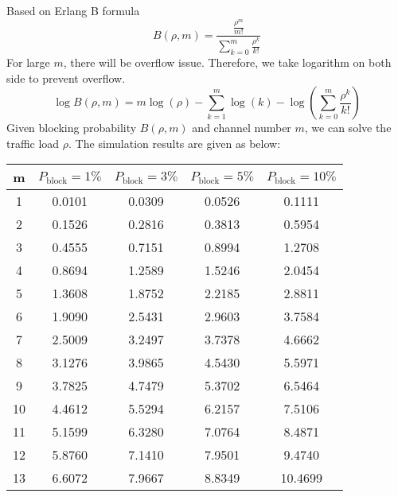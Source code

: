Based on Erlang B formula
\begin{equation*}
    B\left(\rho, m\right) = \frac{\frac{\rho^{m}}{m!}}{\sum\limits_{k = 0}^{m}\frac{\rho^{k}}{k!}}
\end{equation*}
For large $m$, there will be overflow issue. Therefore, we take logarithm on both side to prevent overflow.
\begin{equation*}
    \log B\left(\rho, m\right) = m \log\left(\rho\right) - \sum_{k=1}^{m} \log\left(k\right) - \log\left(\sum\limits_{k = 0}^{m}\frac{\rho^{k}}{k!}\right)
\end{equation*}
Given blocking probability $B\left(\rho, m\right)$ and channel number $m$, we can solve the traffic load $\rho$.
The simulation results are given as below:
\begin{table}[H]
    \begin{center}
        \begin{tabular}{|c|c|c|c|c|}
            \hline
            \textbf{m} & \textbf{$P_{\text{block}} = 1\%$} & \textbf{$P_{\text{block}} = 3\%$} & \textbf{$P_{\text{block}} = 5\%$} & \textbf{$P_{\text{block}} = 10\%$} \\
            \hline
            1 & 0.0101 & 0.0309 & 0.0526 & 0.1111 \\
            \hline
            2 & 0.1526 & 0.2816 & 0.3813 & 0.5954 \\
            \hline
            3 & 0.4555 & 0.7151 & 0.8994 & 1.2708 \\
            \hline
            4 & 0.8694 & 1.2589 & 1.5246 & 2.0454 \\
            \hline
            5 & 1.3608 & 1.8752 & 2.2185 & 2.8811 \\
            \hline
            6 & 1.9090 & 2.5431 & 2.9603 & 3.7584 \\
            \hline
            7 & 2.5009 & 3.2497 & 3.7378 & 4.6662 \\
            \hline
            8 & 3.1276 & 3.9865 & 4.5430 & 5.5971 \\
            \hline
            9 & 3.7825 & 4.7479 & 5.3702 & 6.5464 \\
            \hline
            10 & 4.4612 & 5.5294 & 6.2157 & 7.5106 \\
            \hline
            11 & 5.1599 & 6.3280 & 7.0764 & 8.4871 \\
            \hline
            12 & 5.8760 & 7.1410 & 7.9501 & 9.4740 \\
            \hline
            13 & 6.6072 & 7.9667 & 8.8349 & 10.4699 \\

\end{tabular}
\end{center}
\end{table}
